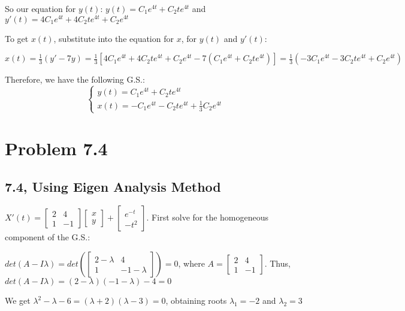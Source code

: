 \documentclass{article}
\begin{document}
\noindent So our equation for $y(t)$: $y(t) = C_{1}e^{4t} + C_{2}te^{4t}$ and $y'(t) = 4C_{1}e^{4t} + 4C_{2}te^{4t} + C_{2}e^{4t}$ \par\vspace{0.25cm}

\noindent To get $x(t)$, substitute into the equation for $x$, for $y(t)$ and $y'(t)$: \par 
\noindent $x(t) = \frac{1}{3}(y' - 7y) = \frac{1}{3}[4C_{1}e^{4t} + 4C_{2}te^{4t} + C_{2}e^{4t} - 7(C_{1}e^{4t} + C_{2}te^{4t})] = \frac{1}{3}(-3C_{1}e^{4t} - 3C_{2}te^{4t} + C_{2}e^{4t})$ \par\vspace{0.25cm}

\noindent Therefore, we have the following G.S.:
$$
\begin{cases}
y(t) = C_{1}e^{4t} + C_{2}te^{4t}\\
x(t) = -C_{1}e^{4t} - C_{2}te^{4t} + \frac{1}{3}C_{2}e^{4t}
\end{cases}
$$ 

\section{Problem 7.4}
\subsection{7.4, Using Eigen Analysis Method}
\noindent $X'(t) = \begin{bmatrix}
    2 & 4 \\
    1 & -1
\end{bmatrix}
\begin{bmatrix}
    x\\
    y
\end{bmatrix} +
\begin{bmatrix}
    e^{-t}\\
    -t^{2}
\end{bmatrix}$.
First solve for the homogeneous component of the G.S.: \par
\noindent $det(A - I\lambda) = det(\begin{bmatrix}
    2 - \lambda & 4 \\
    1 & -1 - \lambda
\end{bmatrix}) = 0$, where $A = \begin{bmatrix}
    2 & 4 \\
    1 & -1
\end{bmatrix}$.  Thus, $det(A - I\lambda) = (2 - \lambda)(-1 - \lambda) - 4 = 0$ \par
\noindent We get $\lambda^{2} - \lambda - 6 = (\lambda + 2)(\lambda - 3) = 0$, obtaining roots $\lambda_{1} = -2$ and $\lambda_{2} = 3$ \par\vspace{0.25cm}
\end{document}
